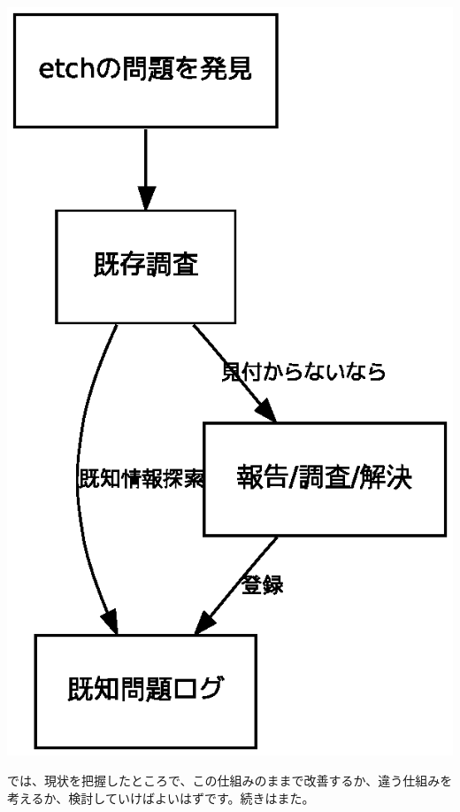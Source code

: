 \documentclass[mingoth,a4paper]{jsarticle}
\begin{document}
\begin{minipage}{0.4\hsize}
 \includegraphics[width=0.9\hsize]{image200705/problemcycle.eps}
\end{minipage}

では、現状を把握したところで、この仕組みのままで改善するか、違う仕組みを
考えるか、検討していけばよいはずです。続きはまた。

\cleartooddpage
\end{document}
